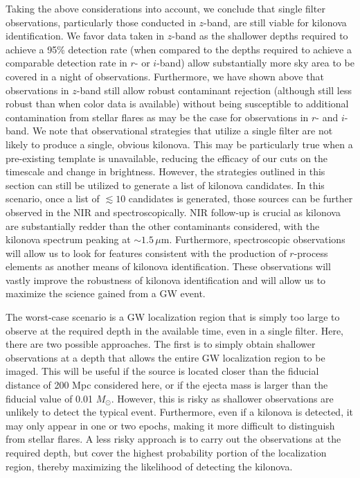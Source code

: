 Taking the above considerations into account, we conclude that single filter observations, particularly those conducted in $z$-band, are still viable for kilonova identification. We favor data taken in $z$-band as the shallower depths required to achieve a 95\% detection rate (when compared to the depths required to achieve a comparable detection rate in $r$- or $i$-band) allow substantially more sky area to be covered in a night of observations.  Furthermore, we have shown above that observations in $z$-band still allow robust contaminant rejection (although still less robust than when color data is available) without being susceptible to additional contamination from stellar flares as may be the case for observations in $r$- and $i$-band. We note that observational strategies that utilize a single filter are not likely to  produce a single, obvious kilonova. This may be particularly true when a pre-existing template is unavailable, reducing the efficacy of our cuts on the timescale and change in brightness. However, the strategies outlined in this section can still be utilized to generate a list of kilonova candidates. In this scenario, once a list of $\lesssim10$ candidates is generated, those sources can be further observed in the NIR and spectroscopically. NIR follow-up is crucial as kilonova are substantially redder than the other contaminants considered, with the kilonova spectrum peaking at $\sim1.5\,\mu$m. Furthermore, spectroscopic observations will allow us to look for features consistent with the production of $r$-process elements as another means of kilonova identification. These observations will vastly improve the robustness of kilonova identification and will allow us to maximize the science gained from a GW event. 

The worst-case scenario is a GW localization region that is simply too large to observe at the required depth in the available time, even in a single filter. Here, there are two possible approaches. The first is to simply obtain shallower observations at a depth that allows the entire GW localization region to be imaged. This will be useful if the source is located closer than the fiducial distance of 200 Mpc considered here, or if the ejecta mass is larger than the fiducial value of 0.01 $M_{\odot}$. However, this is risky as shallower observations are unlikely to detect the typical event. Furthermore, even if a kilonova is detected, it may only appear in one or two epochs, making it more difficult to distinguish from stellar flares. A less risky approach is to carry out the observations at the required depth, but cover the highest probability portion of the localization region, thereby maximizing the likelihood of detecting the kilonova. 

